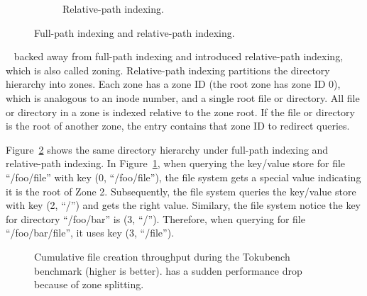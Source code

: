 \begin{figure}
\begin{subfigure}{.5\textwidth}
        \caption{\label{subfig:RPI} Relative-path indexing.}
    \end{subfigure}
    \caption[Full-path indexing and relative-path indexing]{\label{fig:FPIRPI}
        Full-path indexing and relative-path indexing.}
\end{figure}

\betrfsTwo~\citep{betrfs2,betrfs2tos} backed away from full-path indexing and
introduced relative-path indexing, which is also called zoning.
Relative-path indexing partitions the directory hierarchy into zones.
Each zone has a zone ID (the root zone has zone ID 0), which is analogous to an
inode number, and a single root file or directory.
All file or directory in a zone is indexed relative to the zone root.
If the file or directory is the root of another zone, the entry contains that
zone ID to redirect queries.

Figure~\ref{fig:FPIRPI} shows the same directory hierarchy under full-path
indexing and relative-path indexing.
In Figure~\ref{subfig:RPI}, when querying the key/value store for file
``/foo/file'' with key (0, ``/foo/file''), the file system gets a special value
indicating it is the root of Zone 2.
Subsequently, the file system queries the key/value store with key (2, ``/'')
and gets the right value.
Similary, the file system notice the key for directory ``/foo/bar'' is
(3, ``/'').
Therefore, when querying for file ``/foo/bar/file'', it uses key (3, ``/file'').

\begin{figure}[t]
    \centering
    \caption[Zone maintainance cost in TokuBench]{Cumulative file creation
        throughput during the Tokubench benchmark (higher is better).
        \betrfsThree has a sudden performance drop because of zone splitting.}
    \label{fig:tokuzone}
\end{figure}

